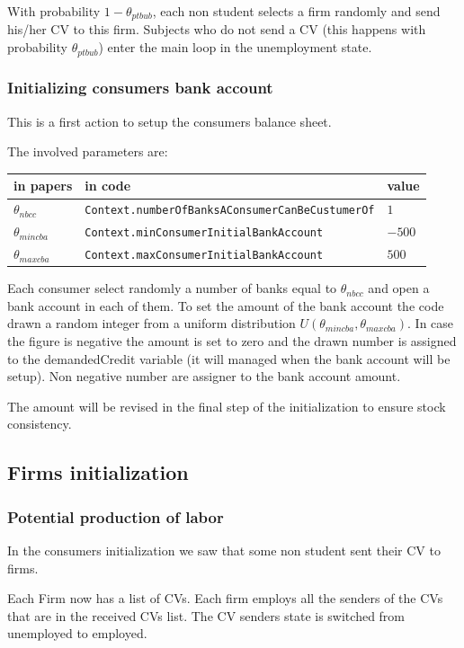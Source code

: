 \documentclass{book}
\begin{document}
\vskip5mm
With probability $1-\theta_{ptbub}$, each non student selects a firm randomly and send his/her CV to this firm. Subjects who do not send a CV (this happens with probability $\theta_{ptbub}$) enter the main loop in the unemployment state. 

\subsubsection{Initializing consumers bank account}

This is a first action to setup the consumers balance sheet. 

The involved parameters are:\\
\begin{tabular}{l l l}
	\hline
	in papers& in code&value\\
	\hline
	\hline
 $\theta_{nbcc}$&\verb+Context.numberOfBanksAConsumerCanBeCustumerOf+&$1$\\
 $\theta_{mincba}$&\verb+Context.minConsumerInitialBankAccount+&$-500$\\
 $\theta_{maxcba}$&\verb+Context.maxConsumerInitialBankAccount+&$500$\\
	\hline
\end{tabular}

\vskip5mm

Each consumer select randomly a number of banks equal to $\theta_{nbcc}$ and open a bank account in each of them. To set the amount of the bank account the code drawn a random integer from a uniform distribution $U(\theta_{mincba},\theta_{maxcba})$. In case the figure is negative the amount is set to zero and the drawn number is assigned to the demandedCredit variable (it will managed when the bank account will be setup). Non negative number are assigner to the bank account amount.

The amount will be revised in the final step of the initialization to ensure stock consistency.

\subsection{Firms initialization}
\subsubsection{Potential production of labor}
In the consumers initialization we saw that some non student sent their CV to firms.

Each Firm now has a list of CVs. Each firm employs all the senders of the CVs that are in the received CVs list. The CV senders state is switched from unemployed to employed.
\end{document}
